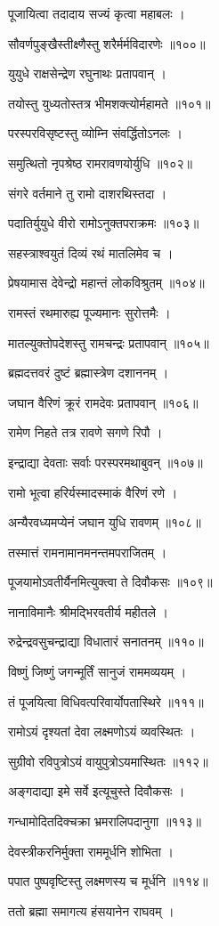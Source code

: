 पूजायित्वा तदादाय सज्यं कृत्वा महाबलः ।

सौवर्णपुङ्खैस्तीक्ष्णैस्तु शरैर्मर्मविदारणेः ॥१००॥

युयुधे राक्षसेन्द्रेण रघुनाथः प्रतापवान् ।

तयोस्तु युध्यतोस्तत्र भीमशक्त्योर्महामते ॥१०१॥

परस्परविसृष्टस्तु व्योम्नि संवर्द्धितोऽनलः ।

समुत्थितो नृपश्रेष्ठ रामरावणयोर्युधि ॥१०२॥

संगरे वर्तमाने तु रामो दाशरथिस्तदा ।

पदातिर्युयुधे वीरो रामोऽनुक्तपराक्रमः ॥१०३॥

सहस्त्राश्वयुतं दिव्यं रथं मातलिमेव च ।

प्रेषयामास देवेन्द्रो महान्तं लोकविश्रुतम् ॥१०४॥

रामस्तं रथमारुह्य पूज्यमानः सुरोत्तमैः ।

मातल्युक्तोपदेशस्तु रामचन्द्रः प्रतापवान् ॥१०५॥

ब्रह्मदत्तवरं दुष्टं ब्रह्मास्त्रेण दशाननम् ।

जघान वैरिणं क्रूरं रामदेवः प्रतापवान् ॥१०६॥

रामेण निहते तत्र रावणे सगणे रिपौ ।

इन्द्राद्या देवताः सर्वाः परस्परमथाबुवन् ॥१०७॥

रामो भूत्वा हरिर्यस्मादस्माकं वैरिणं रणे ।

अन्यैरवध्यमप्येनं जघान युधि रावणम् ॥१०८॥

तस्मात्तं रामनामानमनन्तमपराजितम् ।

पूजयामोऽवतीर्यैनमित्युक्त्वा ते दिवौकसः ॥१०९॥

नानाविमानैः श्रीमद्भिरवतीर्य महीतले ।

रुद्रेन्द्रवसुचन्द्राद्या विधातारं सनातनम् ॥११०॥

विष्णुं जिष्णुं जगन्मूर्तिं सानुजं राममव्ययम् ।

तं पूजयित्वा विधिवत्परिवार्योपतास्थिरे ॥१११॥

रामोऽयं दृश्यतां देवा लक्ष्मणोऽयं व्यवस्थितः ।

सुग्रीवो रविपुत्रोऽयं वायुपुत्रोऽयमास्थितः ॥११२॥

अङ्गदाद्या इमे सर्वे इत्यूचुस्ते दिवौकसः ।

गन्धामोदितदिक्चक्रा भ्रमरालिपदानुगा ॥११३॥

देवस्त्रीकरनिर्मुक्ता राममूर्धनि शोभिता ।

पपात पुष्पवृष्टिस्तु लक्ष्मणस्य च मूर्धनि ॥११४॥

ततो ब्रह्मा समागत्य हंसयानेन राघवम् ।

